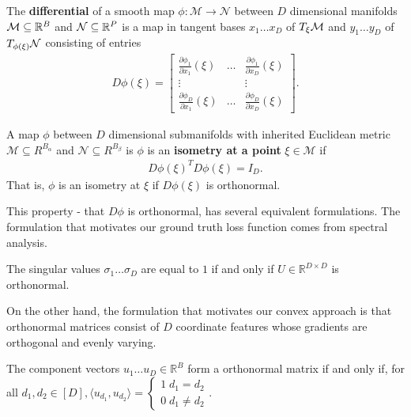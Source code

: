 \begin{definition}
The \textbf{differential} of a smooth map $\phi:\mathcal M \to \mathcal N$ between $D$ dimensional manifolds $\mathcal{M} \subseteq \mathbb R^B$ and $\mathcal{N} \subseteq \mathbb R^P$ is a map in tangent bases $x_1 \dots x_{D}$ of $T_\xi \mathcal{M}$ and $y_1 \dots y_{D}$ of $T_{\phi(\xi)} \mathcal{N}$ consisting of entries
\begin{align}
\label{eq:diff}
    D\phi (\xi) = \begin{bmatrix}
    \frac{\partial \phi_1  }{\partial x_1}(\xi)  & \dots & \frac{\partial \phi_1 }{\partial x_D}(\xi)  \\
    \vdots & & \vdots \\
    \frac{\partial \phi_D }{\partial x_1}(\xi)  & \dots & \frac{\partial \phi_{D}  }{\partial x_{D}}(\xi) 
    \end{bmatrix}.
\end{align}
\end{definition}

\begin{definition}
\label{def:isometric_at_a_point}
A map $\phi$ between $D$ dimensional submanifolds with inherited Euclidean metric $\mathcal M \subseteq R^{B_\alpha}$ and $\mathcal N  \subseteq R^{B_\beta}$ is 
$\phi$ is an \textbf{isometry at a point} $\xi \in \mathcal M$ if
\begin{align}
{D \phi (\xi)}^T D \phi (\xi) = I_D.
\end{align}
That is, $\phi$ is an isometry at $\xi$ if $D \phi (\xi)$ is orthonormal.
\end{definition}

This property - that $D\phi$ is orthonormal, has several equivalent formulations.
The formulation that motivates our ground truth loss function comes from spectral analysis.
\begin{proposition}
\label{prop:orthonormal_spectrum}
The singular values $\sigma_1 \dots \sigma_D$ are equal to $1$ if and only if $U \in \mathbb{R}^{D \times D}$ is orthonormal.
\end{proposition}
On the other hand, the formulation that motivates our convex approach is that orthonormal matrices consist of $D$ coordinate features whose gradients are orthogonal and evenly varying.
\begin{proposition}
\label{prop:orthonormal_basis}
The component vectors $u_1 \dots u_D \in \mathbb R^B$ form a orthonormal matrix if and only if, for all $d_1, d_2 \in [D], \langle u_{d_1}, u_{d_2} \rangle = \begin{cases}
1 \; d_1 = d_2 \\ 
0 \; d_1 \neq d_2 
\end{cases}$.
\end{proposition}

